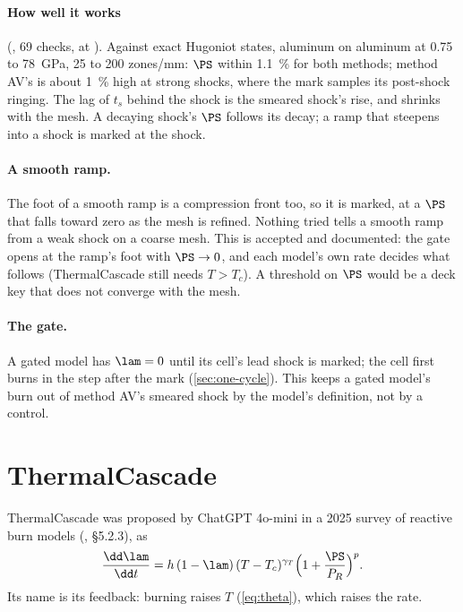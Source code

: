 \paragraph{How well it works} (,
69 checks, at ). Against exact Hugoniot states, aluminum on
aluminum at 0.75 to 78~GPa, 25 to 200 zones/mm: $\PS$ within 1.1~\% for both
methods; method AV's is about 1~\% high at strong shocks, where the mark
samples its post-shock ringing. The lag of $t_s$ behind the shock is the
smeared shock's rise, and shrinks with the mesh. A decaying shock's $\PS$
follows its decay; a ramp that steepens into a shock is marked at the shock.

\paragraph{A smooth ramp.} The foot of a smooth ramp is a compression front
too, so it is marked, at a $\PS$ that falls toward zero as the mesh is
refined. Nothing tried tells a smooth ramp from a weak shock on a coarse
mesh. This is accepted and documented: the gate opens at the ramp's foot with
$\PS \to 0$, and each model's own rate decides what follows (ThermalCascade
still needs $T > T_c$). A threshold on $\PS$ would be a deck key that does
not converge with the mesh.

\paragraph{The gate.} A gated model has $\lam = 0$ until its cell's lead
shock is marked; the cell first burns in the step after the mark
(\cref{sec:one-cycle}). This keeps a gated model's burn out of method AV's
smeared shock by the model's definition, not by a control.

\section{ThermalCascade}
\label{sec:thermalcascade}

ThermalCascade was proposed by ChatGPT 4o-mini in a 2025 survey of reactive
burn models (\cite{kittell2025sand}, \S 5.2.3), as
\begin{equation*}
  \frac{\dd\lam}{\dd t} = h\,(1 - \lam)\,(T - T_c)^{\gamma_T}
  \Bigl(1 + \frac{\PS}{P_R}\Bigr)^{p}.
\end{equation*}
Its name is its feedback: burning raises $T$ (\cref{eq:theta}), which raises
the rate.

